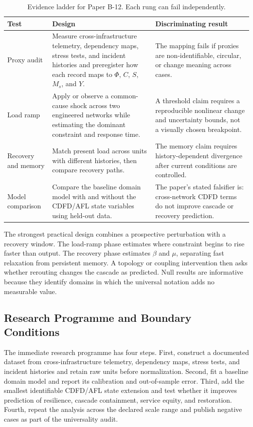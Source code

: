\documentclass[12pt,a4paper]{article}
\begin{document}
\begin{table}[htbp]
\centering
\small
\caption{Evidence ladder for Paper B-12. Each rung can fail independently.}
\begin{tabularx}{\textwidth}{|p{}|X|X|}
\hline
\textbf{Test} & \textbf{Design} & \textbf{Discriminating result} \\
\hline
Proxy audit & Measure cross-infrastructure telemetry, dependency maps, stress tests, and incident histories and preregister how each record maps to $\Phi$, $C$, $S$, $M_s$, and $Y$. & The mapping fails if proxies are non-identifiable, circular, or change meaning across cases. \\
\hline
Load ramp & Apply or observe a common-cause shock across two engineered networks while estimating the dominant constraint and response time. & A threshold claim requires a reproducible nonlinear change and uncertainty bounds, not a visually chosen breakpoint. \\
\hline
Recovery and memory & Match present load across units with different histories, then compare recovery paths. & The memory claim requires history-dependent divergence after current conditions are controlled. \\
\hline
Model comparison & Compare the baseline domain model with and without the CDFD/AFL state variables using held-out data. & The paper's stated falsifier is: cross-network CDFD terms do not improve cascade or recovery prediction. \\
\hline
\end{tabularx}
\end{table}

The strongest practical design combines a prospective perturbation with a
recovery window. The load-ramp phase estimates where constraint begins to rise
faster than output. The recovery phase estimates $\beta$ and $\mu$, separating
fast relaxation from persistent memory. A topology or coupling intervention
then asks whether rerouting changes the cascade as predicted. Null results are
informative because they identify domains in which the universal notation adds
no measurable value.

\subsection{Research Programme and Boundary Conditions}

The immediate research programme has four steps. First, construct a documented
dataset from cross-infrastructure telemetry, dependency maps, stress tests, and incident histories and retain raw units before normalization.
Second, fit a baseline domain model and report its calibration and out-of-sample
error. Third, add the smallest identifiable CDFD/AFL state extension and test
whether it improves prediction of resilience, cascade containment, service equity, and restoration. Fourth, repeat the
analysis across the declared scale range and publish negative cases as part of
the universality audit.
\end{document}
